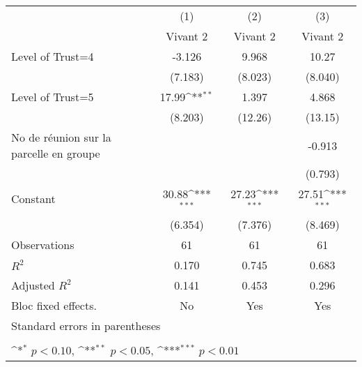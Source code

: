 {
\def\sym#1{\ifmmode^{#1}\else\(^{#1}\)\fi}
\begin{tabular}{l*{3}{c}}
\hline\hline
                    &\multicolumn{1}{c}{(1)}&\multicolumn{1}{c}{(2)}&\multicolumn{1}{c}{(3)}\\
                    &\multicolumn{1}{c}{Vivant 2}&\multicolumn{1}{c}{Vivant 2}&\multicolumn{1}{c}{Vivant 2}\\
\hline
Level of Trust=4    &      -3.126         &       9.968         &       10.27         \\
                    &     (7.183)         &     (8.023)         &     (8.040)         \\
[1em]
Level of Trust=5    &       17.99\sym{**} &       1.397         &       4.868         \\
                    &     (8.203)         &     (12.26)         &     (13.15)         \\
[1em]
No de réunion sur la parcelle en groupe&                     &                     &      -0.913         \\
                    &                     &                     &     (0.793)         \\
[1em]
Constant            &       30.88\sym{***}&       27.23\sym{***}&       27.51\sym{***}\\
                    &     (6.354)         &     (7.376)         &     (8.469)         \\
\hline
Observations        &          61         &          61         &          61         \\
\(R^{2}\)           &       0.170         &       0.745         &       0.683         \\
Adjusted \(R^{2}\)  &       0.141         &       0.453         &       0.296         \\
Bloc fixed effects. &          No         &         Yes         &         Yes         \\
\hline\hline
\multicolumn{4}{l}{\footnotesize Standard errors in parentheses}\\
\multicolumn{4}{l}{\footnotesize }\\
\multicolumn{4}{l}{\footnotesize \sym{*} \(p<0.10\), \sym{**} \(p<0.05\), \sym{***} \(p<0.01\)}\\
\end{tabular}
}
